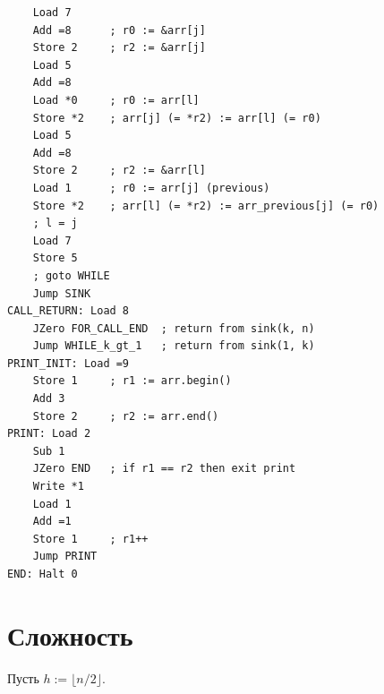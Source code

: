 \documentclass[12pt]{article}
\begin{document}
\begin{verbatim}
    Load 7
    Add =8      ; r0 := &arr[j]
    Store 2     ; r2 := &arr[j]
    Load 5
    Add =8
    Load *0     ; r0 := arr[l]
    Store *2    ; arr[j] (= *r2) := arr[l] (= r0)
    Load 5
    Add =8
    Store 2     ; r2 := &arr[l]
    Load 1      ; r0 := arr[j] (previous)
    Store *2    ; arr[l] (= *r2) := arr_previous[j] (= r0)
    ; l = j
    Load 7
    Store 5
    ; goto WHILE
    Jump SINK
CALL_RETURN: Load 8
    JZero FOR_CALL_END  ; return from sink(k, n)
    Jump WHILE_k_gt_1   ; return from sink(1, k)
PRINT_INIT: Load =9
    Store 1     ; r1 := arr.begin()
    Add 3
    Store 2     ; r2 := arr.end()
PRINT: Load 2
    Sub 1
    JZero END   ; if r1 == r2 then exit print
    Write *1
    Load 1
    Add =1
    Store 1     ; r1++
    Jump PRINT
END: Halt 0
\end{verbatim}

\section{Сложность}

Пусть $h:=\lfloor n/2\rfloor$.
\end{document}
